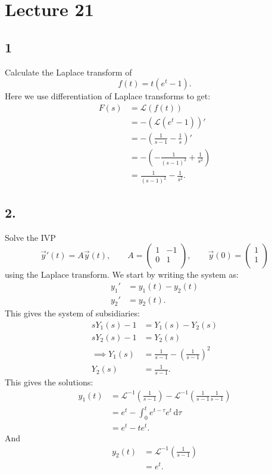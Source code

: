 \section*{Lecture 21}

\subsection*{1} Calculate the Laplace transform of
\[ 
f(t) = t \left( e^{t}-1 \right) 
.\]
\bigbreak
Here we use differentiation of Laplace transforms to get:
\begin{align*}
  F(s) &= \mathcal{L}\left( f(t) \right)  \\
  &= - \left( \mathcal{L}\left( e^{t}-1 \right)  \right)'  \\
  &= - \left( \frac{1}{s-1} - \frac{1}{s} \right)' \\
  &= - \left( - \frac{1}{\left( s-1 \right)^2} + \frac{1}{s^2} \right) \\
  &= \frac{1}{\left( s-1 \right)^2} - \frac{1}{s^2}
.\end{align*}


\subsection*{2.} Solve the IVP
\[ 
\Vec{y}'(t) = A \Vec{y}(t), \qquad A = \begin{pmatrix}
1 & -1\\
0 & 1\\
\end{pmatrix}, \qquad \Vec{y}(0) = \begin{pmatrix}
1\\
1\\
\end{pmatrix}
\]
using the Laplace transform.
\bigbreak
We start by writing the system as:
\begin{align*}
  y_1' &= y_{1}(t) - y_2(t) \\
  y_2' &= y_2(t)
.\end{align*}
This gives the system of subsidiaries:
\begin{align*}
  sY_1(s) - 1 &= Y_1(s) - Y_2(s) \\
  s Y_{2}(s) - 1 &= Y_2(s) \\
  \implies Y_1(s) &= \frac{1}{s-1} - \left( \frac{1}{s-1} \right)^2 \\
  Y_2(s) &= \frac{1}{s-1}
.\end{align*}
This gives the solutions:
\begin{align*}
  y_1(t) &= \mathcal{L}^{-1} \left( \frac{1}{s-1} \right) - \mathcal{L}^{-1} \left( \frac{1}{s-1} \frac{1}{s-1} \right)  \\
  &= e^{t} - \int_{0}^{t} e^{t - \tau} e^{t} \, \mathrm{d}\tau \\
  &= e^{t} - t e^{t}
.\end{align*}
And
\begin{align*}
  y_2(t) &= \mathcal{L}^{-1} \left( \frac{1}{s-1} \right) \\
         &= e^{t}
.\end{align*}



